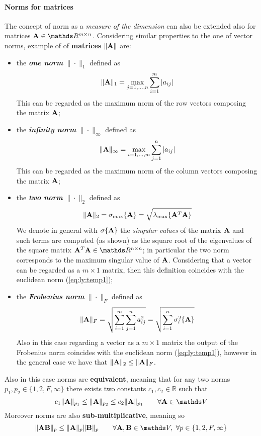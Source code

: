 	\paragraph{Norms for matrices} The concept of norm as a \textit{measure of the dimension} can also be extended also for matrices $\A \in \mathds R^{m\times n}$. Considering similar properties to the one of vector norms, example of  of \textbf{matrices} $\|\mathbf{A}\|$ are:
	\begin{itemize}
		\item the \textit{\textbf{one norm}} $\|\cdot\|_1$ defined as
		\begin{equation}
			\|\mathbf{A}\|_1 = \max_{j=1,\dots,n} \sum_{i=1}^{m} |a_{ij}|
		\end{equation}
		This can be regarded as the maximum norm of the row vectors composing the matrix $\mathbf{A}$;
		\item the \textit{\textbf{infinity norm}} $\|\cdot\|_\infty$ defined as
		\begin{equation}
			\|\mathbf{A}\|_\infty = \max_{i=1,\dots,m} \sum_{j=1}^{n} |a_{ij}|
		\end{equation}
		This can be regarded as the maximum norm of the column vectors composing the matrix $\mathbf{A}$;
		
		\item the \textit{\textbf{two norm}} $\|\cdot\|_2$ defined as
		\begin{equation}
			\|\mathbf{A}\|_2 = \sigma_{\max}\{ \mathbf{A}\} = \sqrt{\lambda_{\max} \{\mathbf{A}^T \mathbf{A} \}}
		\end{equation}
		We denote in general with $\sigma\{\mathbf{A}\}$ the \textit{singular values} of the matrix $\mathbf{A}$ and such terms are computed (as shown) as the square root of the eigenvalues of the square matrix $\A^T \A \in \mathds R^{n\times n}$; in particular the two norm corresponds to the maximum singular value of $\mathbf{A}$. Considering that a vector can be regarded as a $m\times 1$ matrix, then this definition coincides with the euclidean norm (\ref{eq:ly:temp1});
		
		\item the \textbf{\textit{Frobenius norm}} $\|\cdot\|_F$ defined as
		\begin{equation}
			\|\mathbf{A}\|_F = \sqrt{\sum_{i=1}^m \sum_{j=1}^n a_{ij}^2} = \sqrt{\sum_{i=1}^n \sigma_i^2\{\mathbf{A}\}}
		\end{equation}
		Also in this case regarding a vector as a $m\times 1$  matrix the output of the Frobenius norm coincides with the euclidean norm (\ref{eq:ly:temp1}), however in the general case we have that $\|\mathbf{A}\|_2 \leq \|\mathbf{A}\|_F$.
	\end{itemize}
	Also in this case norms are \textbf{equivalent}, meaning that for any two norms $p_1,p_2 \in \{1,2,F,\infty\}$ there exists two constants $c_1,c_2\in \mathds R$ such that
	\[ c_1 \|\A\|_{p_1} \leq \|\A\|_{p_2} \leq c_2 \|\A\|_{p_1} \qquad \forall \A \in \mathds V \]
	Moreover norms are also \textbf{sub-multiplicative}, meaning so
	\[ \|\A\B\|_p \leq  \|\A\|_p \|\B\|_p \qquad \forall \A,\B \in \mathds V, \  \forall p \in \{1,2,F,\infty\} \]
	
